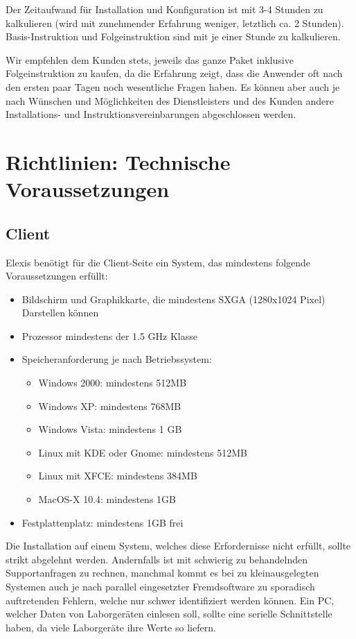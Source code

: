 \documentclass[paper=a4,BCOR8.25mm,twoside]{scrartcl}
\begin{document}
Der Zeitaufwand für Installation und Konfiguration ist mit 3-4 Stunden zu kalkulieren (wird mit zunehmender Erfahrung weniger, letztlich ca. 2 Stunden). Basis-Instruktion und Folgeinstruktion sind mit je einer Stunde zu kalkulieren.

Wir empfehlen dem Kunden stets, jeweils das ganze Paket inklusive Folgeinstruktion zu kaufen, da die Erfahrung zeigt, dass die Anwender oft nach den ersten paar Tagen noch wesentliche Fragen haben. Es können aber auch je nach Wünschen und Möglichkeiten des Dienstleisters und des Kunden andere Installations- und Instruktionsvereinbarungen abgeschlossen werden.

\section{Richtlinien: Technische Voraussetzungen}
\label{voraussetzungen}
\subsection{Client}
Elexis benötigt für die Client-Seite ein System, das mindestens folgende Voraussetzungen erfüllt:
\begin{itemize}
    \item Bildschirm und Graphikkarte, die mindestens SXGA (1280x1024 Pixel) Darstellen können
    \item Prozessor mindestens der 1.5 GHz Klasse
    \item Speicheranforderung je nach Betriebssystem:
    \begin{itemize}
        \item Windows 2000:     mindestens 512MB
        \item Windows XP:       mindestens 768MB
        \item Windows Vista:    mindestens 1 GB
        \item Linux mit KDE oder Gnome: mindestens 512MB
        \item Linux mit XFCE:   mindestens 384MB
        \item MacOS-X 10.4:     mindestens 1GB
    \end{itemize}
    \item Festplattenplatz: mindestens 1GB frei
\end{itemize}
Die Installation auf einem System, welches diese Erfordernisse nicht erfüllt, sollte strikt abgelehnt werden. Andernfalls ist mit schwierig zu behandelnden Supportanfragen zu rechnen, manchmal kommt es bei \glqq zu klein\grqq ausgelegten Systemen auch je nach parallel eingesetzter Fremdsoftware zu sporadisch auftretenden Fehlern, welche nur schwer identifiziert werden können.
Ein PC, welcher Daten von Laborgeräten einlesen soll, sollte eine serielle Schnittstelle haben, da viele Laborgeräte ihre Werte so liefern.
\end{document}
